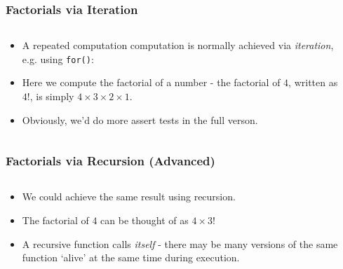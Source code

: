 
\begin{frame}[fragile]
\frametitle{Factorials via Iteration}
\begin{columns}

\begin{column}{0.55\textwidth}
\begin{itemize}[<+->]
\item A repeated computation computation is normally
achieved via {\it iteration}, e.g. using \verb^for()^:
\item Here we compute the factorial of a number - the factorial of
$4$, written as $4!$, is simply $4\times3\times2\times1$.
\item Obviously, we'd do more assert tests in the full verson.
\end{itemize}
\end{column}

\pause
\begin{column}{0.40\textwidth}

\end{column}

\end{columns}
\end{frame}


\begin{frame}[fragile]
\frametitle{Factorials via Recursion (Advanced)}
\begin{columns}

\begin{column}{0.60\textwidth}
\begin{itemize}[<+->]
\item We could achieve the same result using recursion.
\item The factorial of $4$ can be thought of as $4\times3!$
\item A recursive function calls {\it itself} - there may be many versions of the same function `alive' at the same time during execution.
\end{itemize}
\end{column}

\begin{column}{0.35\textwidth}

\end{column}

\end{columns}
\end{frame}

